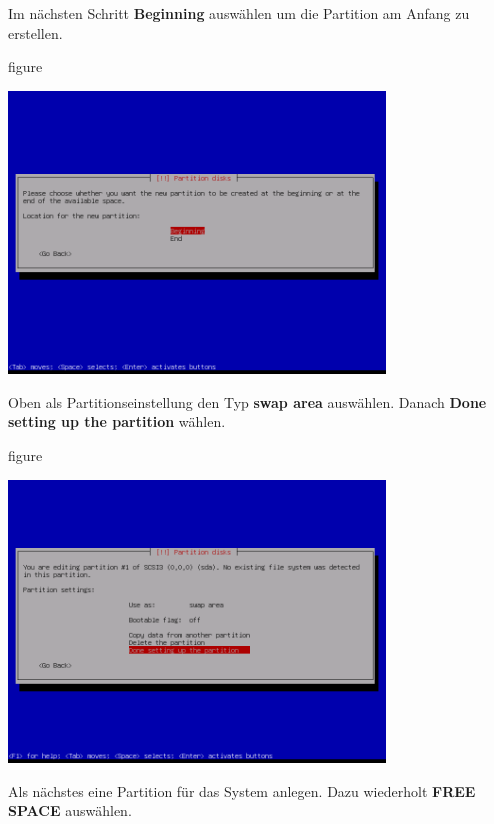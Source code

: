 Im nächsten Schritt \textbf{Beginning} auswählen um die Partition am Anfang zu
erstellen.

\begin{nofloat}{figure}
\begin{center}
\includegraphics[width=0.75\textwidth]{screenshots/18_ubuntu_install.png}
\end{center}
\end{nofloat}
\newpage
Oben als Partitionseinstellung den Typ \textbf{swap area} auswählen. Danach
\textbf{Done setting up the partition} wählen.

\begin{nofloat}{figure}
\begin{center}
\includegraphics[width=0.75\textwidth]{screenshots/19_ubuntu_install.png}
\end{center}
\end{nofloat}

Als nächstes eine Partition für das System anlegen. Dazu wiederholt
\textbf{FREE SPACE} auswählen.

